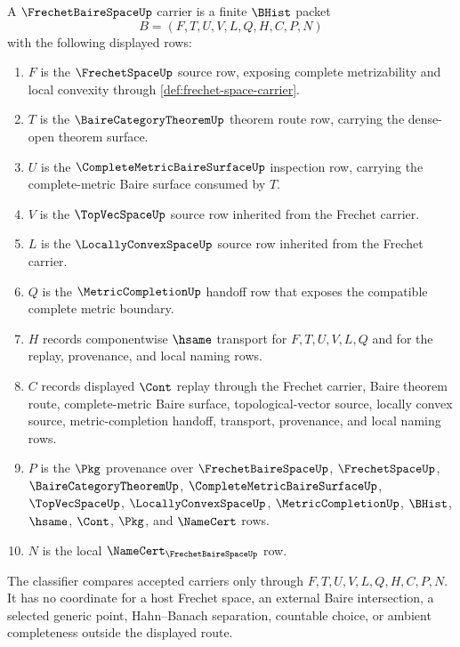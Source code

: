 \begin{definition}
\label{def:frechet-space-baire-carrier}
A $\FrechetBaireSpaceUp$ carrier is a finite $\BHist$ packet
$$
B=(F,T,U,V,L,Q,H,C,P,N)
$$
with the following displayed rows:
\begin{enumerate}
\item $F$ is the $\FrechetSpaceUp$ source row, exposing complete metrizability and local convexity through \autoref{def:frechet-space-carrier}.
\item $T$ is the $\BaireCategoryTheoremUp$ theorem route row, carrying the dense-open theorem surface.
\item $U$ is the $\CompleteMetricBaireSurfaceUp$ inspection row, carrying the complete-metric Baire surface consumed by $T$.
\item $V$ is the $\TopVecSpaceUp$ source row inherited from the Frechet carrier.
\item $L$ is the $\LocallyConvexSpaceUp$ source row inherited from the Frechet carrier.
\item $Q$ is the $\MetricCompletionUp$ handoff row that exposes the compatible complete metric boundary.
\item $H$ records componentwise $\hsame$ transport for $F,T,U,V,L,Q$ and for the replay, provenance, and local naming rows.
\item $C$ records displayed $\Cont$ replay through the Frechet carrier, Baire theorem route, complete-metric Baire surface, topological-vector source, locally convex source, metric-completion handoff, transport, provenance, and local naming rows.
\item $P$ is the $\Pkg$ provenance over $\FrechetBaireSpaceUp$, $\FrechetSpaceUp$, $\BaireCategoryTheoremUp$, $\CompleteMetricBaireSurfaceUp$, $\TopVecSpaceUp$, $\LocallyConvexSpaceUp$, $\MetricCompletionUp$, $\BHist$, $\hsame$, $\Cont$, $\Pkg$, and $\NameCert$ rows.
\item $N$ is the local $\NameCert_{\FrechetBaireSpaceUp}$ row.
\end{enumerate}
The classifier compares accepted carriers only through $F,T,U,V,L,Q,H,C,P,N$. It has no coordinate for a host Frechet space, an external Baire intersection, a selected generic point, Hahn--Banach separation, countable choice, or ambient completeness outside the displayed route.
\end{definition}

